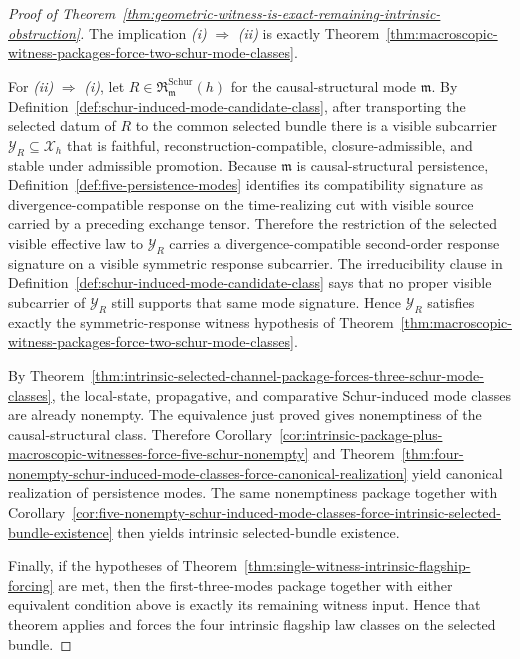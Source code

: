 \begin{proof}[Proof of Theorem~\ref{thm:geometric-witness-is-exact-remaining-intrinsic-obstruction}]
\label{proof:thm:geometric-witness-is-exact-remaining-intrinsic-obstruction}
The implication \emph{(i)} \(\Rightarrow\) \emph{(ii)} is exactly
Theorem~\ref{thm:macroscopic-witness-packages-force-two-schur-mode-classes}.

For \emph{(ii)} \(\Rightarrow\) \emph{(i)}, let
\(R\in \mathfrak R^{\mathrm{Schur}}_{\mathfrak m}(h)\) for the
causal-structural mode \(\mathfrak m\). By
Definition~\ref{def:schur-induced-mode-candidate-class}, after transporting the
selected datum of \(R\) to the common selected bundle there is a visible
subcarrier \(\mathcal Y_R\subseteq \mathcal X_h\) that is faithful,
reconstruction-compatible, closure-admissible, and stable under admissible
promotion. Because \(\mathfrak m\) is causal-structural persistence,
Definition~\ref{def:five-persistence-modes} identifies its compatibility
signature as divergence-compatible response on the time-realizing cut with
visible source carried by a preceding exchange tensor. Therefore the
restriction of the selected visible effective law to \(\mathcal Y_R\) carries a
divergence-compatible second-order response signature on a visible symmetric
response subcarrier. The irreducibility clause in
Definition~\ref{def:schur-induced-mode-candidate-class} says that no proper
visible subcarrier of \(\mathcal Y_R\) still supports that same mode signature.
Hence \(\mathcal Y_R\) satisfies exactly the symmetric-response witness
hypothesis of
Theorem~\ref{thm:macroscopic-witness-packages-force-two-schur-mode-classes}.

By Theorem~\ref{thm:intrinsic-selected-channel-package-forces-three-schur-mode-classes},
the local-state, propagative, and comparative Schur-induced mode classes are
already nonempty. The equivalence just proved gives nonemptiness of the
causal-structural class. Therefore
Corollary~\ref{cor:intrinsic-package-plus-macroscopic-witnesses-force-five-schur-nonempty}
and
Theorem~\ref{thm:four-nonempty-schur-induced-mode-classes-force-canonical-realization}
yield canonical realization of persistence modes. The same nonemptiness
package together with
Corollary~\ref{cor:five-nonempty-schur-induced-mode-classes-force-intrinsic-selected-bundle-existence}
then yields intrinsic selected-bundle existence.

Finally, if the hypotheses of
Theorem~\ref{thm:single-witness-intrinsic-flagship-forcing} are met, then the
first-three-modes package together with either equivalent condition above is
exactly its remaining witness input. Hence that theorem applies and forces the
four intrinsic flagship law classes on the selected bundle.
\end{proof}

